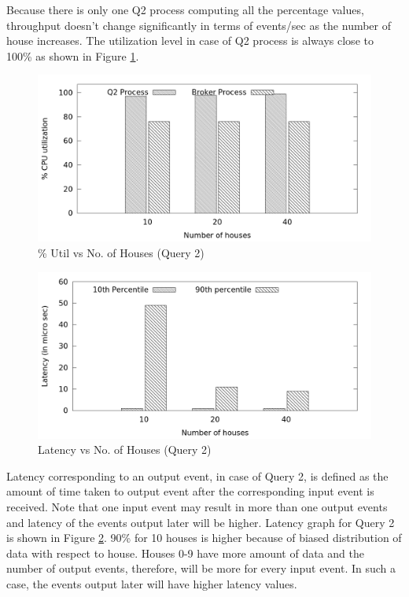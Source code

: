 \vspace*{-0.5cm}
Because there is only one Q2 process computing all the percentage values, throughput doesn't change significantly in terms of events/sec as the number of house increases. The utilization level in case of Q2 process is always close to 100\% as shown in Figure \ref{fig:q2_util}.

\begin{figure}[h]
\begin{center}
	\includegraphics[scale=0.55]{img/q2_utilization}
	\vspace*{-0.3cm}
	\caption{\% Util vs No. of Houses (Query 2) \label{fig:q2_util}}
\end{center}
\end{figure}

\vspace*{-0.4cm}

\begin{figure}[h]
\begin{center}
	\includegraphics[scale=0.6]{img/q2_latency}
	\vspace*{-0.3cm}
	\caption{Latency vs No. of Houses (Query 2) \label{fig:q2_latency}}
\end{center}
\end{figure}

\vspace*{-0.4cm}
Latency corresponding to an output event, in case of Query 2, is defined as the amount of time taken to output event after the corresponding input event is received. Note that one input event may result in more than one output events and latency of the events output later will be higher. Latency graph for Query 2 is shown in Figure \ref{fig:q2_latency}. 90\% for 10 houses is higher because of biased distribution of data with respect to house. Houses 0-9 have more amount of data and the number of output events, therefore, will be more for every input event. In such a case, the events output later will have higher latency values.